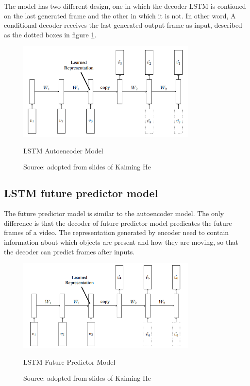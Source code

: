 \documentclass[twoside,a4paper,article]{combine}
\begin{document}
The model has two different design, one in which the decoder LSTM is contioned on the last generated frame and the other in which it is
not. In other word, A conditional decoder receives the last generated output frame as input, described as the dotted boxes in figure 
\ref{fig:autoencoder}.

\begin{figure}[h!]
    \includegraphics[width=0.8\textwidth]{autoencoder}
    \caption{LSTM Autoencoder Model}
    \caption*{Source: adopted from slides of Kaiming He}
    \label{fig:autoencoder}
\end{figure}

\subsection{LSTM future predictor model}
The future predictor model is similar to the autoencoder model. The only difference is that the decoder of future predictor model
predicates the future frames of a video. The representation generated by encoder need to contain information about which objects are 
present and how they are moving, so that the decoder can predict frames after inputs.
\begin{figure}[ht!]
    \includegraphics[width=0.8\textwidth]{predictor}
    \caption{LSTM Future Predictor Model}
    \caption*{Source: adopted from slides of Kaiming He}
    \label{fig:predictor}
\end{figure}
\end{document}
